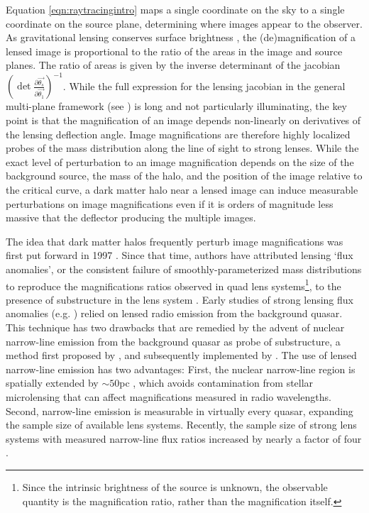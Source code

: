Equation \ref{eqn:raytracingintro} maps a single coordinate on the sky to a single coordinate on the source plane, determining where images appear to the observer. As gravitational lensing conserves surface brightness \cite{MisnerThorneWheeler}, the (de)magnification of a lensed image is proportional to the ratio of the areas in the image and source planes. The ratio of areas is given by the inverse determinant of the jacobian $\left(\det \frac{\partial \vec{\theta_s}}{\partial \vec{\theta_1}}\right)^{-1}$. While the full expression for the lensing jacobian in the general multi-plane framework (see \cite{BlandfordNarayan86}) is long and not particularly illuminating, the key point is that the magnification of an image depends non-linearly on derivatives of the lensing deflection angle. Image magnifications are therefore highly localized probes of the mass distribution along the line of sight to strong lenses. While the exact level of perturbation to an image magnification depends on the size of the background source, the mass of the halo, and the position of the image relative to the critical curve, a dark matter halo near a lensed image can induce measurable perturbations on image magnifications even if it is orders of magnitude less massive that the deflector producing the multiple images. 

The idea that dark matter halos frequently perturb image magnifications was first put forward in 1997 \cite{MaoSchneider98}. Since that time, authors have attributed lensing `flux anomalies', or the consistent failure of smoothly-parameterized mass distributions to reproduce the magnifications ratios observed in quad lens systems\footnote{Since the intrinsic brightness of the source is unknown, the observable quantity is the magnification ratio, rather than the magnification itself.}, to the presence of substructure in the lens system \cite{Metcalf++02,D+K02,Xu++12,Xu++15}. Early studies of strong lensing flux anomalies (e.g. \cite{D+K02}) relied on lensed radio emission from the background quasar. This technique has two drawbacks that are remedied by the advent of nuclear narrow-line emission from the background quasar as probe of substructure, a method first proposed by \cite{MoustakasMetcalf02}, and subsequently implemented by \cite{Sugai++07,Nierenberg++14,Nierenberg++17,Nierenberg++19}. The use of lensed narrow-line emission has two advantages: First, the nuclear narrow-line region is spatially extended by $\sim 50$pc \cite{MullerSanchez++11}, which avoids contamination from stellar microlensing that can affect magnifications measured in radio wavelengths. Second, narrow-line emission is measurable in virtually every quasar, expanding the sample size of available lens systems. Recently, the sample size of strong lens systems with measured narrow-line flux ratios increased by nearly a factor of four \cite{Nierenberg++19}. 


